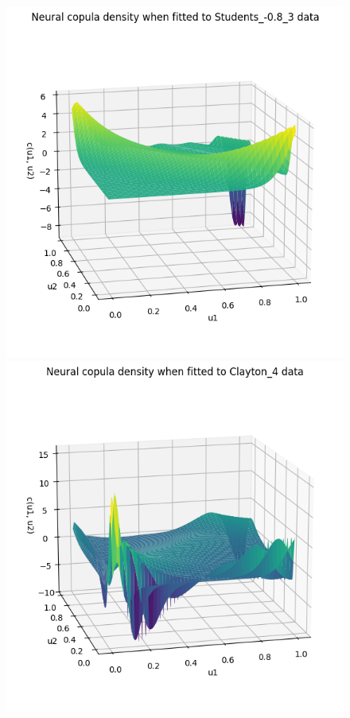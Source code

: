 \documentclass[%
a4paper,							
11pt,								
bibliography=totoc,						
abstracton=true					
]
{scrartcl}
\theoremstyle{plain}
\theoremstyle{definition}
\theoremstyle{remark}
\newcommand{\1}{\mathbbm{1}}
\begin{document}
\begin{figure}[H]
\begin{minipage}{0.45\textwidth}
    \end{minipage}
    \vfill
    \begin{minipage}{0.45\textwidth}
        \centering
        \includegraphics[width=\textwidth]{5ResultsDiscussion/pictures/PortfolioTest/CopulaGradient3.png}
    \end{minipage}
    \hfill
    \begin{minipage}{0.45\textwidth}
        \centering
        \includegraphics[width=\textwidth]{5ResultsDiscussion/pictures/PortfolioTest/CopulaGradient4.png}

\end{minipage}
\end{figure}
\end{document}
